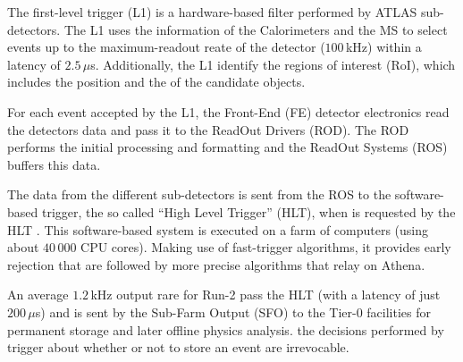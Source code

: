 The first-level trigger (L1) is a hardware-based filter performed by ATLAS sub-detectors. The L1 uses the information of the Calorimeters and the MS %
to select events up to the maximum-readout reate of the detector ($100\,$kHz) within a latency of $2.5\,\mu$s. 
Additionally, the L1 identify the regions of interest (RoI), which includes the position and the \pT of the candidate objects.

For each event accepted by the L1, the Front-End (FE) detector electronics read the detectors data and pass it to the ReadOut Drivers (ROD).
The ROD performs the initial processing and formatting and the ReadOut Systems (ROS) buffers  this data. 

The data from the different sub-detectors is sent from the ROS to the software-based trigger, 
the so called ``High Level Trigger'' (HLT), when is requested by the HLT \cite{ATLAS:2003aa}.
This software-based system is executed on a farm of computers (using about $40\,000$ CPU cores). 
Making use of fast-trigger algorithms, it provides early rejection that are followed by more precise
algorithms that relay on Athena.

An average $1.2\,$kHz output rare for Run-2 pass the HLT (with a latency of just $200\,\mu$s) and is sent by the Sub-Farm Output (SFO)
to the Tier-0 facilities for permanent storage and later offline physics analysis.  %
the decisions performed by trigger about whether or not to store an event are irrevocable. %





